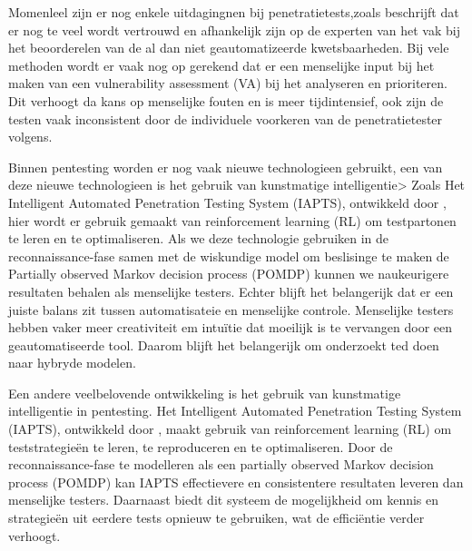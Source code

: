 Momenleel zijn er nog enkele uitdagingnen bij penetratietests,zoals \textcite{Fugkeaw} beschrijft dat er nog te veel wordt 
vertrouwd en afhankelijk zijn op de experten van het vak bij het beoorderelen van de al dan niet geautomatizeerde kwetsbaarheden. 
Bij vele methoden wordt er vaak nog op gerekend dat er een menselijke input bij het maken van een vulnerability assessment (VA) 
bij het analyseren en prioriteren. Dit verhoogt da kans op menselijke fouten en is meer tijdintensief, ook zijn de testen vaak 
inconsistent door de individuele voorkeren van de penetratietester volgens\textcite{Ghanem}.

Binnen pentesting worden er nog vaak nieuwe technologieen gebruikt, een van deze nieuwe technologieen is het gebruik van 
kunstmatige intelligentie> Zoals Het Intelligent Automated Penetration Testing System (IAPTS), ontwikkeld door \textcite{Ghanem},
hier wordt er gebruik gemaakt van reinforcement learning (RL) om testpartonen te leren en te optimaliseren. Als we deze technologie 
gebruiken in de reconnaissance-fase samen met de wiskundige model om beslisinge te maken de Partially observed Markov decision process (POMDP)
kunnen we naukeurigere resultaten behalen als menselijke testers.
Echter blijft het belangerijk dat er een juiste balans zit tussen automatisateie en menselijke controle. Menselijke testers hebben vaker 
meer creativiteit em intuïtie dat moeilijk is te vervangen door een geautomatiseerde tool. Daarom blijft het belangerijk om onderzoekt ted 
doen naar hybryde modelen.

Een andere veelbelovende ontwikkeling is het gebruik van kunstmatige intelligentie in pentesting. Het Intelligent Automated 
Penetration Testing System (IAPTS), ontwikkeld door \textcite{Ghanem}, maakt gebruik van reinforcement learning (RL) om 
teststrategieën te leren, te reproduceren en te optimaliseren. Door de reconnaissance-fase te modelleren als een partially observed 
Markov decision process (POMDP) kan IAPTS effectievere en consistentere resultaten leveren dan menselijke testers. Daarnaast biedt 
dit systeem de mogelijkheid om kennis en strategieën uit eerdere tests opnieuw te gebruiken, wat de efficiëntie verder verhoogt.







